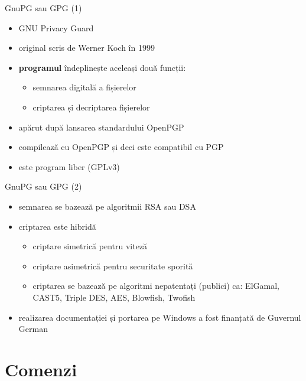 \documentclass{beamer}
\begin{document}
\begin{frame}{GnuPG sau GPG (1)}
  \begin{itemize}
    \item GNU Privacy Guard
    \item original scris de Werner Koch în 1999
    \item \textbf{programul} îndeplinește aceleași două funcții:
    \begin{itemize}
      \item semnarea digitală a fișierelor
      \item criptarea și decriptarea fișierelor
    \end{itemize}
    \item apărut după lansarea standardului OpenPGP
    \item compilează cu OpenPGP și deci este compatibil cu PGP
    \item este program liber (GPLv3)
  \end{itemize}
\end{frame}

\begin{frame}{GnuPG sau GPG (2)}
  \begin{itemize}
    \item semnarea se bazează pe algoritmii RSA sau DSA
    \item criptarea este hibridă
    \begin{itemize}
      \item criptare simetrică pentru viteză
      \item criptare asimetrică pentru securitate sporită
      \item criptarea se bazează pe algoritmi nepatentați (publici) ca:
      ElGamal, CAST5, Triple DES, AES, Blowfish, Twofish
    \end{itemize}
    \item realizarea documentației și portarea pe Windows a fost finanțată de 
    Guvernul German
  \end{itemize}
\end{frame}

\section{Comenzi}
\frame{\tableofcontents[currentsection]}
\end{document}
